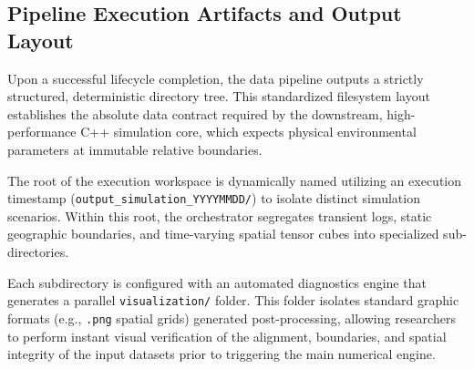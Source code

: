 \subsection{Pipeline Execution Artifacts and Output Layout}
\label{subsec:execution_results}

Upon a successful lifecycle completion, the data pipeline outputs a strictly structured, deterministic directory tree. This standardized 
filesystem layout establishes the absolute data contract required by the downstream, high-performance C++ simulation core, which expects 
physical environmental parameters at immutable relative boundaries.

The root of the execution workspace is dynamically named utilizing an execution timestamp (\texttt{output\_simulation\_YYYYMMDD/}) to 
isolate distinct simulation scenarios. Within this root, the orchestrator segregates transient logs, static geographic boundaries, and 
time-varying spatial tensor cubes into specialized sub-directories.

Each subdirectory is configured with an automated diagnostics engine that generates a parallel \texttt{visualization/} folder. This folder 
isolates standard graphic formats (e.g., \texttt{.png} spatial grids) generated post-processing, allowing researchers to perform instant 
visual verification of the alignment, boundaries, and spatial integrity of the input datasets prior to triggering the main numerical engine.

